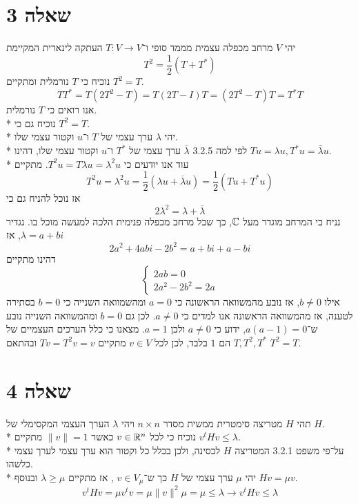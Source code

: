 \section{שאלה 3}
יהי $V$ מרחב מכפלה עצמית מממד סופי ו־$T: V \to V$ העתקה לינארית המקיימת
\[
	T^2 = \frac{1}{2}(T + T^*)
\]
נוכיח כי $T$ נורמלית ומתקיים $T^2 = T$.
\[
	T T^* = T (2T^2 - T) = T (2T - I) T = (2T^2 - T) T = T^* T
\]
אנו רואים כי $T$ נורמלית. \\*
נוכיח גם כי $T^2 = T$. \\*
יהי $\lambda$ ערך עצמי של $T$ ו־$u$ וקטור עצמי שלו. \\*
לפי למה 3.2.5 $\overline{\lambda}$ ערך עצמי של $T^*$ ו־$u$ וקטור עצמי שלו,
דהינו $T u = \lambda u, T^* u = \overline{\lambda} u$. \\*
עוד אנו יודעים כי $T^2 u = T \lambda u = \lambda^2 u$. מתקיים
\[
	T^2 u = \lambda^2 u = \frac{1}{2}(\lambda u + \overline{\lambda} u) = \frac{1}{2}(T u + T^* u)
\]
אז נוכל להניח גם כי
\[
	2 \lambda^2 = \lambda + \overline{\lambda}
\]
נניח כי המרחב מוגדר מעל $\mathbb{C}$, כך שכל מרחב מכפלה פנימית הלכה למעשה מוכל בו.
נגדיר $\lambda = a + bi$, אז
\[
	2a^2 + 4abi - 2b^2 = a + bi + a - bi
\]
דהינו מתקיים
\[
	\begin{cases}
		2ab = 0 \\
		2a^2 - 2b^2 = 2a
	\end{cases}
\]
אילו $b \ne 0$, אז נובע מהמשוואה הראשונה כי $a = 0$ ומהשמוואה השנייה כי $b = 0$ בסתירה לטענה, אז מהמשוואה הראשונה אנו למדים כי $a \ne 0$.
לכן גם $b = 0$ ומהמשוואה השנייה נובע ש־$a(a - 1) = 0$, ידוע כי $a \ne 0$ ולכן $a = 1$.
מצאנו כי כלל הערכים העצמיים של $T, T^2, T^*$ הם $1$ בלבד, לכן לכל $v \in V$ מתקיים $T v = T^2 v = v$ ובהתאם $T^2 = T$.

\section{שאלה 4}
תהי $H$ מטריצה סימטרית ממשית מסדר $n \times n$ ויהי $\lambda$ הערך העצמי המקסימלי של $H$. \\*
נוכיח כי לכל $v \in \mathbb{R}^n$ כאשר $\lVert v \rVert = 1$ מתקיים $v^t H v \le \lambda$. \\*
על־פי משפט 3.2.1 המטריצה $H$ לכסינה, ולכן בכלל כל וקטור הוא ערך עצמי לערך עצמי כלשהו. \\*
יהי $\mu$ ערך עצמי של $H$ כך ש־$v \in V_\mu$ , אז מתקיים $\lambda \ge \mu$ ובנוסף $H v = \mu v$.
\[
	v^t H v = \mu v^t v = \mu \lVert v \rVert^2 \mu = \mu \le \lambda \rightarrow v^t H v \le \lambda
\]

